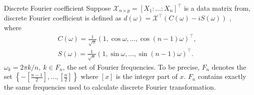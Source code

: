 \documentclass[handout,xcolor={usenames,dvipsnames}]{beamer}
\begin{document}
\begin{frame}{Discrete Fourier coefficient}
Suppose $\mathcal{\mathcal{X}}_{n\times p} = [X_1:\ldots:X_n]^\top$ is a data matrix from, discrete Fourier coefficient is defined as 
$d(\omega) = \mathcal{X}^\top(C(\omega)-iS(\omega))$ , where 
\begin{equation}
\label{eq:cos_sin_coef}
\begin{aligned}
C(\omega) = \frac{1}{\sqrt{n}} (1, \cos \omega, \dots, \cos (n-1)\omega)^\top,\\
S(\omega) = \frac{1}{\sqrt{n}} (1, \sin \omega, \dots, \sin (n-1)\omega)^\top.
\end{aligned}
\end{equation}
$\omega_k = 2\pi k/n, ~ k\in F_n$,  the set of Fourier frequencies. To be precise, $F_n$ denotes the set  $\left\{-[\frac{n-1}{2}], \dots, [\frac{n}{2}]\right\}$ where $[x]$ is the integer part of $x$. $F_n$ contains exactly the same frequencies used to calculate discrete Fourier transformation. 
\end{frame}
\end{document}

